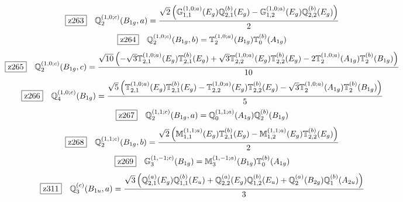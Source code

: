 \documentclass[fleqn,10pt,landscape]{jsarticle}
\begin{document}
\begin{dmath*}
\hspace*{3mm}\fbox{z263}\quad \mathbb{Q}_{2}^{(1,0;c)}(B_{1g},a)=\frac{\sqrt{2} \left(\mathbb{G}_{1,1}^{(1,0;a)}(E_{g}) \mathbb{Q}_{2,1}^{(b)}(E_{g}) - \mathbb{G}_{1,2}^{(1,0;a)}(E_{g}) \mathbb{Q}_{2,2}^{(b)}(E_{g})\right)}{2}
\end{dmath*}
\begin{dmath*}
\hspace*{3mm}\fbox{z264}\quad \mathbb{Q}_{2}^{(1,0;c)}(B_{1g},b)=\mathbb{T}_{2}^{(1,0;a)}(B_{1g}) \mathbb{T}_{0}^{(b)}(A_{1g})
\end{dmath*}
\begin{dmath*}
\hspace*{3mm}\fbox{z265}\quad \mathbb{Q}_{2}^{(1,0;c)}(B_{1g},c)=\frac{\sqrt{10} \left(- \sqrt{3} \mathbb{T}_{2,1}^{(1,0;a)}(E_{g}) \mathbb{T}_{2,1}^{(b)}(E_{g}) + \sqrt{3} \mathbb{T}_{2,2}^{(1,0;a)}(E_{g}) \mathbb{T}_{2,2}^{(b)}(E_{g}) - 2 \mathbb{T}_{2}^{(1,0;a)}(A_{1g}) \mathbb{T}_{2}^{(b)}(B_{1g})\right)}{10}
\end{dmath*}
\begin{dmath*}
\hspace*{3mm}\fbox{z266}\quad \mathbb{Q}_{4}^{(1,0;c)}(B_{1g})=\frac{\sqrt{5} \left(\mathbb{T}_{2,1}^{(1,0;a)}(E_{g}) \mathbb{T}_{2,1}^{(b)}(E_{g}) - \mathbb{T}_{2,2}^{(1,0;a)}(E_{g}) \mathbb{T}_{2,2}^{(b)}(E_{g}) - \sqrt{3} \mathbb{T}_{2}^{(1,0;a)}(A_{1g}) \mathbb{T}_{2}^{(b)}(B_{1g})\right)}{5}
\end{dmath*}
\begin{dmath*}
\hspace*{3mm}\fbox{z267}\quad \mathbb{Q}_{2}^{(1,1;c)}(B_{1g},a)=\mathbb{Q}_{0}^{(1,1;a)}(A_{1g}) \mathbb{Q}_{2}^{(b)}(B_{1g})
\end{dmath*}
\begin{dmath*}
\hspace*{3mm}\fbox{z268}\quad \mathbb{Q}_{2}^{(1,1;c)}(B_{1g},b)=\frac{\sqrt{2} \left(\mathbb{M}_{1,1}^{(1,1;a)}(E_{g}) \mathbb{T}_{2,1}^{(b)}(E_{g}) - \mathbb{M}_{1,2}^{(1,1;a)}(E_{g}) \mathbb{T}_{2,2}^{(b)}(E_{g})\right)}{2}
\end{dmath*}
\begin{dmath*}
\hspace*{3mm}\fbox{z269}\quad \mathbb{G}_{3}^{(1,-1;c)}(B_{1g})=\mathbb{M}_{3}^{(1,-1;a)}(B_{1g}) \mathbb{T}_{0}^{(b)}(A_{1g})
\end{dmath*}
\begin{dmath*}
\hspace*{3mm}\fbox{z311}\quad \mathbb{Q}_{3}^{(c)}(B_{1u},a)=\frac{\sqrt{3} \left(\mathbb{Q}_{2,1}^{(a)}(E_{g}) \mathbb{Q}_{1,1}^{(b)}(E_{u}) + \mathbb{Q}_{2,2}^{(a)}(E_{g}) \mathbb{Q}_{1,2}^{(b)}(E_{u}) + \mathbb{Q}_{2}^{(a)}(B_{2g}) \mathbb{Q}_{1}^{(b)}(A_{2u})\right)}{3}
\end{dmath*}
\end{document}
